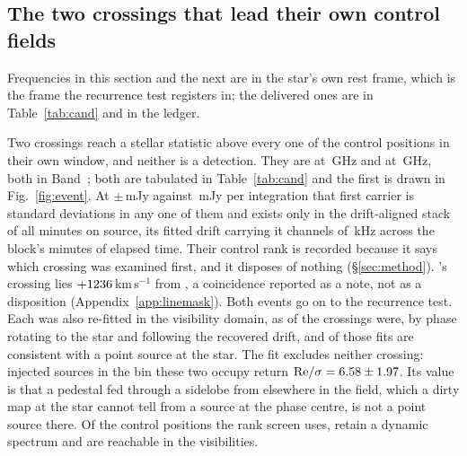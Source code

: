 \subsection{The two crossings that lead their own control fields}
\label{sec:vistest}

Frequencies in this section and the next are in the star's own rest frame,
which is the frame the recurrence test registers in; the delivered ones are in
Table~\ref{tab:cand} and in the ledger.

Two crossings reach a stellar statistic above every one of the \NCtrl{}
control positions in their own window, and neither is a detection. They are
\EvAStar{} at \RqFreqSx\,GHz and \EvBStar{} at \RqFreqCp\,GHz, both in
Band~\EvABand; both are tabulated in Table~\ref{tab:cand} and the first is
drawn in Fig.~\ref{fig:event}. At \EvAFlux$\pm$\EvAFluxErr\,mJy against
\EvARmsInt\,mJy per integration that first carrier is \EvAPerIntSig{}
standard deviations in any one of them and exists only in the drift-aligned
stack of all \EvADwellMin{} minutes on source, its fitted drift carrying it
\EvADriftChan{} channels of \EvAChanwkHz\,kHz across the block's
\EvAElapsedMin{} minutes of elapsed time. Their control rank is recorded because it says which crossing was examined
first, and it disposes of nothing (\S\ref{sec:method}).
\EvBStar's crossing lies $+1236$\,km\,s$^{-1}$ from \EvBLine, a coincidence
reported as a note, not as a disposition
(Appendix~\ref{app:linemask}). Both events go on to the recurrence test. Each was also re-fitted in the visibility domain, as \LgNFit{} of the
\NCross{} crossings were, by phase rotating to the star and following the
recovered drift, and \LgNLocalCor{} of those fits are consistent with a point
source at the star. The fit excludes neither crossing: injected sources in
the bin these two occupy return
${\rm Re}/\sigma=6.58\pm1.97$. Its value is that a pedestal fed through a sidelobe from elsewhere in
the field, which a dirty map at the star cannot tell from a source at the
phase centre, is not a point source there. Of the \NCtrl{} control positions
the rank screen uses, \RcNRetCtrl{} retain a dynamic spectrum and
\RcNVisCtrl{} are reachable in the visibilities.

